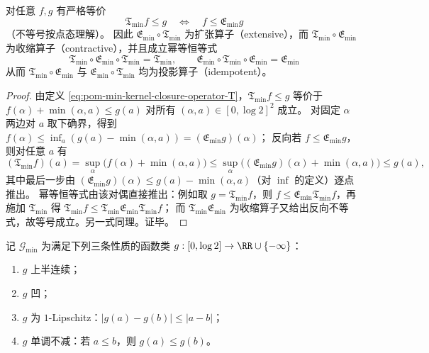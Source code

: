 \begin{theorem}\label{thm:pom-min-kernel-galois-adjunction-closure}
对任意 \(f,g\) 有严格等价
\[
\boxed{\;
\mathfrak{T}_{\min}f\le g\quad\Longleftrightarrow\quad f\le \mathfrak{E}_{\min}g\;}
\]
（不等号按点态理解）。
因此 \(\mathfrak{E}_{\min}\circ\mathfrak{T}_{\min}\) 为扩张算子（extensive），而 \(\mathfrak{T}_{\min}\circ\mathfrak{E}_{\min}\) 为收缩算子（contractive），并且成立幂等恒等式
\[
\boxed{\;
\mathfrak{T}_{\min}\circ\mathfrak{E}_{\min}\circ\mathfrak{T}_{\min}=\mathfrak{T}_{\min},\qquad
\mathfrak{E}_{\min}\circ\mathfrak{T}_{\min}\circ\mathfrak{E}_{\min}=\mathfrak{E}_{\min}\;}
\]
从而 \(\mathfrak{T}_{\min}\circ\mathfrak{E}_{\min}\) 与 \(\mathfrak{E}_{\min}\circ\mathfrak{T}_{\min}\) 均为投影算子（idempotent）。
\end{theorem}
\begin{proof}
由定义 \eqref{eq:pom-min-kernel-closure-operator-T}，\(\mathfrak{T}_{\min}f\le g\) 等价于
\(
f(\alpha)+\min(\alpha,a)\le g(a)
\)
对所有 \((\alpha,a)\in[0,\log 2]^2\) 成立。
对固定 \(\alpha\) 两边对 \(a\) 取下确界，得到
\(
f(\alpha)\le \inf_a(g(a)-\min(\alpha,a))=(\mathfrak{E}_{\min}g)(\alpha)
\)；
反向若 \(f\le \mathfrak{E}_{\min}g\)，则对任意 \(a\) 有
\[
(\mathfrak{T}_{\min}f)(a)
=\sup_{\alpha}\bigl(f(\alpha)+\min(\alpha,a)\bigr)
\le \sup_{\alpha}\bigl((\mathfrak{E}_{\min}g)(\alpha)+\min(\alpha,a)\bigr)
\le g(a),
\]
其中最后一步由 \((\mathfrak{E}_{\min}g)(\alpha)\le g(a)-\min(\alpha,a)\)（对 \(\inf\) 的定义）逐点推出。
幂等恒等式由该对偶直接推出：例如取 \(g=\mathfrak{T}_{\min}f\)，则 \(f\le \mathfrak{E}_{\min}\mathfrak{T}_{\min}f\)，再施加 \(\mathfrak{T}_{\min}\) 得
\(
\mathfrak{T}_{\min}f\le \mathfrak{T}_{\min}\mathfrak{E}_{\min}\mathfrak{T}_{\min}f
\)；
而 \(\mathfrak{T}_{\min}\mathfrak{E}_{\min}\) 为收缩算子又给出反向不等式，故等号成立。另一式同理。证毕。
\end{proof}

\begin{definition}\label{def:pom-min-kernel-class-G}
记 \(\mathcal{G}_{\min}\) 为满足下列三条性质的函数类 \(g:[0,\log 2]\to\RR\cup\{-\infty\}\)：
\begin{enumerate}
  \item \(g\) 上半连续；
  \item \(g\) 凹；
  \item \(g\) 为 \(1\)-Lipschitz：\(|g(a)-g(b)|\le |a-b|\)；
  \item \(g\) 单调不减：若 \(a\le b\)，则 \(g(a)\le g(b)\)。
\end{enumerate}
\end{definition}

